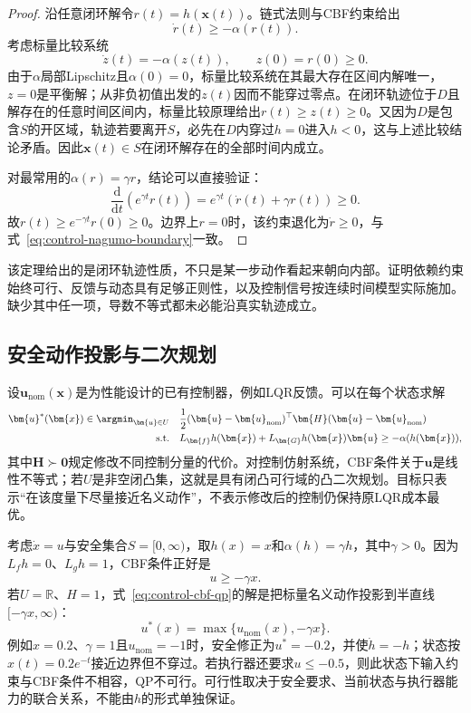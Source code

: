 \begin{proof}
沿任意闭环解令$r(t)=h(\bm{x}(t))$。链式法则与CBF约束给出
\[
  \dot r(t)
  \geq
  -\alpha(r(t)).
\]
考虑标量比较系统
\[
  \dot z(t)=-\alpha(z(t)),
  \qquad z(0)=r(0)\geq0.
\]
由于$\alpha$局部Lipschitz且$\alpha(0)=0$，标量比较系统在其最大存在区间内解唯一，$z=0$是平衡解；从非负初值出发的$z(t)$因而不能穿过零点。在闭环轨迹位于$D$且解存在的任意时间区间内，标量比较原理给出$r(t)\geq z(t)\geq0$。又因为$D$是包含$S$的开区域，轨迹若要离开$S$，必先在$D$内穿过$h=0$进入$h<0$，这与上述比较结论矛盾。因此$\bm{x}(t)\in S$在闭环解存在的全部时间内成立。

对最常用的$\alpha(r)=\gamma r$，结论可以直接验证：
\[
  \frac{\mathrm{d}}{\mathrm{d}t}
  \left(e^{\gamma t}r(t)\right)
  =
  e^{\gamma t}(\dot r(t)+\gamma r(t))
  \geq0.
\]
故$r(t)\geq e^{-\gamma t}r(0)\geq0$。边界上$r=0$时，该约束退化为$\dot r\geq0$，与式~\eqref{eq:control-nagumo-boundary}一致。
\end{proof}
该定理给出的是闭环轨迹性质，不只是某一步动作看起来朝向内部。证明依赖约束始终可行、反馈与动态具有足够正则性，以及控制信号按连续时间模型实际施加。缺少其中任一项，导数不等式都未必能沿真实轨迹成立。
\subsection{安全动作投影与二次规划}
设$\bm{u}_{\mathrm{nom}}(\bm{x})$是为性能设计的已有控制器，例如LQR反馈。可以在每个状态求解
\begin{equation}
  \begin{aligned}
    \bm{u}^{\ast}(\bm{x})
    \in\argmin_{\bm{u}\in U}\quad&
      \frac12
      (\bm{u}-\bm{u}_{\mathrm{nom}})^{\top}
      \bm{H}
      (\bm{u}-\bm{u}_{\mathrm{nom}})\\
    \text{s.t.}\quad&
      L_{\bm{f}}h(\bm{x})
      +
      L_{\bm{G}}h(\bm{x})\bm{u}
      \geq
      -\alpha(h(\bm{x})),
  \end{aligned}
  \label{eq:control-cbf-qp}
\end{equation}
其中$\bm{H}\succ\bm{0}$规定修改不同控制分量的代价。对控制仿射系统，CBF条件关于$\bm{u}$是线性不等式；若$U$是非空闭凸集，这就是具有闭凸可行域的凸二次规划。目标只表示“在该度量下尽量接近名义动作”，不表示修改后的控制仍保持原LQR成本最优。
\begin{example}[一维积分器上的安全投影]
\label{ex:control-cbf-scalar-projection}
考虑$\dot x=u$与安全集合$S=[0,\infty)$，取$h(x)=x$和$\alpha(h)=\gamma h$，其中$\gamma>0$。因为$L_fh=0$、$L_gh=1$，CBF条件正好是
\[
  u\geq-\gamma x.
\]
若$U=\mathbb{R}$、$H=1$，式~\eqref{eq:control-cbf-qp}的解是把标量名义动作投影到半直线$[-\gamma x,\infty)$：
\begin{equation}
  u^{\ast}(x)
  =
  \max\{u_{\mathrm{nom}}(x),-\gamma x\}.
  \label{eq:control-cbf-scalar-projection}
\end{equation}
例如$x=0.2$、$\gamma=1$且$u_{\mathrm{nom}}=-1$时，安全修正为$u^{\ast}=-0.2$，并使$\dot h=-h$；状态按$x(t)=0.2e^{-t}$接近边界但不穿过。若执行器还要求$u\leq-0.5$，则此状态下输入约束与CBF条件不相容，QP不可行。可行性取决于安全要求、当前状态与执行器能力的联合关系，不能由$h$的形式单独保证。
\end{example}

